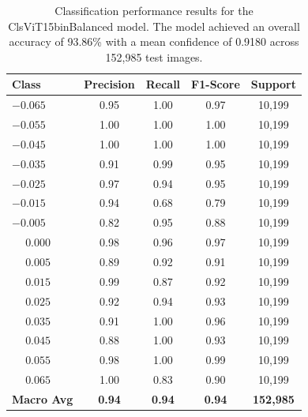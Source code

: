 \begin{table}[htbp]
\centering
\begin{tabular}{@{}lcccc@{}}
\toprule
\textbf{Class} & \textbf{Precision} & \textbf{Recall} & \textbf{F1-Score} & \textbf{Support} \\
\midrule
$-0.065$ & 0.95 & 1.00 & 0.97 & 10,199 \\
$-0.055$ & 1.00 & 1.00 & 1.00 & 10,199 \\
$-0.045$ & 1.00 & 1.00 & 1.00 & 10,199 \\
$-0.035$ & 0.91 & 0.99 & 0.95 & 10,199 \\
$-0.025$ & 0.97 & 0.94 & 0.95 & 10,199 \\
$-0.015$ & 0.94 & 0.68 & 0.79 & 10,199 \\
$-0.005$ & 0.82 & 0.95 & 0.88 & 10,199 \\
$\phantom{-}0.000$ & 0.98 & 0.96 & 0.97 & 10,199 \\
$\phantom{-}0.005$ & 0.89 & 0.92 & 0.91 & 10,199 \\
$\phantom{-}0.015$ & 0.99 & 0.87 & 0.92 & 10,199 \\
$\phantom{-}0.025$ & 0.92 & 0.94 & 0.93 & 10,199 \\
$\phantom{-}0.035$ & 0.91 & 1.00 & 0.96 & 10,199 \\
$\phantom{-}0.045$ & 0.88 & 1.00 & 0.93 & 10,199 \\
$\phantom{-}0.055$ & 0.98 & 1.00 & 0.99 & 10,199 \\
$\phantom{-}0.065$ & 1.00 & 0.83 & 0.90 & 10,199 \\
\midrule
\textbf{Macro Avg} & \textbf{0.94} & \textbf{0.94} & \textbf{0.94} & \textbf{152,985} \\
\bottomrule
\end{tabular}
\caption{Classification performance results for the ClsViT15binBalanced model. The model achieved an overall accuracy of 93.86\% with a mean confidence of 0.9180 across 152,985 test images.}
\label{tab:clf_report_ClsViT15binBalanced}
\end{table}



